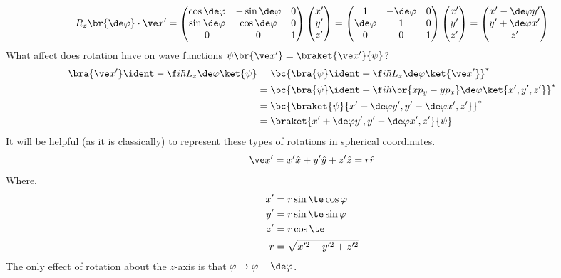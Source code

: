 \documentclass{article}
\begin{document}
\[ R_z\br{\de \varphi}\cdot\ve x' = \begin{pmatrix}
    \cos \de \varphi & -\sin \de \varphi & 0 \\
    \sin \de \varphi & \cos \de \varphi & 0 \\
    0 & 0 & 1 \\
\end{pmatrix}\begin{pmatrix}
    x' \\ y' \\ z'
\end{pmatrix} = \begin{pmatrix}
    1 & -\de \varphi & 0 \\
    \de \varphi & 1 & 0 \\
    0 & 0 & 1 \\
\end{pmatrix}\begin{pmatrix}
    x' \\ y' \\ z'
\end{pmatrix}
= \begin{pmatrix}
    x' - \de \varphi y' \\ y' + \de \varphi x' \\ z'
\end{pmatrix} \]
What affect does rotation have on wave functions $\psi\br{\ve x'} = \braket{\ve x'}{\psi}$?
\begin{align*}
    \bra{\ve x'} \ident - \f i\hbar L_z \de \varphi \ket{\psi}
    &= \bc{\bra{\psi} \ident + \f i\hbar L_z \de \varphi \ket{\ve x'}}^{*} \\
    &= \bc{\bra{\psi} \ident + \f i\hbar \br{x p_y - y p_x} \de \varphi \ket{x',y',z'}}^{*} \\
    &= \bc{\braket{\psi}{x' + \de \varphi y',y' - \de \varphi x',z'}}^{*} \\
    &= \braket{x' + \de \varphi y',y' - \de \varphi x',z'}{\psi}
\end{align*}
It will be helpful (as it is classically) to represent these types of rotations in spherical coordinates.
\[ \ve x' = x' \hat x + y' \hat y + z' \hat z = r \hat r \]
Where,
\begin{align*}
    x' &= r \sin \te \cos \varphi \\
    y' &= r \sin \te \sin \varphi \\
    z' &= r \cos \te \\
    r &= \sqrt{x'^2 + y'^2 + z'^2}
\end{align*}
The only effect of rotation about the $z$-axis is that $\varphi \mapsto \varphi - \de \varphi$.
\end{document}
